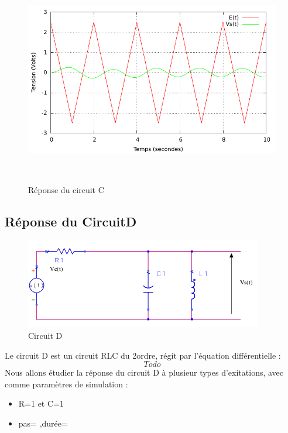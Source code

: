 \documentclass[a4paper,11pt]{article}
\begin{document}
\begin{figure}[h!]
\begin{minipage}[b]{0.5\linewidth}
   \end{minipage}
  \begin{minipage}[b]{0.5\linewidth}   
      \centering \includegraphics[scale=.68]{CCtriangle.pdf}
   \end{minipage}\\
 \caption{Réponse du circuit C}
\end{figure}

\newpage
  \subsection{Réponse du CircuitD}
  
\begin{figure}[H]
	 \begin{center}
	\includegraphics[scale=.7]{circuitTest}
	\caption{Circuit D}
	\end{center}
      \end{figure}
   Le circuit D est un circuit RLC du 2\ieme ordre, régit par l'équation différentielle :
   \begin{equation*}
    Todo
   \end{equation*}
  Nous allons étudier la réponse du circuit D à plusieur types d'exitations, avec comme paramètres de simulation :  \\
  \begin{itemize}
   \item R=1 et C=1
   \item pas= ,durée= 
  \end{itemize}
\end{document}
